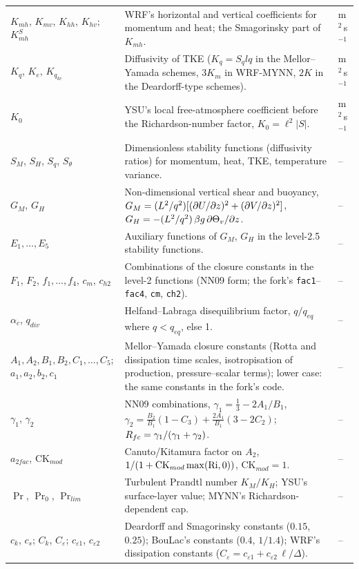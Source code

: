\begin{xltabular}{\linewidth}{@{}>{\raggedright\arraybackslash}p{3.6cm} >{\raggedright\arraybackslash}X >{\raggedright\arraybackslash}p{2.3cm}@{}}
$K_{mh}$, $K_{mv}$, $K_{hh}$, $K_{hv}$; $K^S_{mh}$ & WRF's horizontal and vertical coefficients for momentum and heat; the Smagorinsky part of $K_{mh}$. & m$^2$\,s$^{-1}$ \\
$K_q$, $K_e$, $K_{q_{ke}}$ & Diffusivity of TKE ($K_q = S_q l q$ in the Mellor--Yamada schemes, $3K_m$ in WRF-MYNN, $2K$ in the Deardorff-type schemes). & m$^2$\,s$^{-1}$ \\
$K_0$ & YSU's local free-atmosphere coefficient before the Richardson-number factor, $K_0 = \ell^2|S|$. & m$^2$\,s$^{-1}$ \\
$S_M$, $S_H$, $S_q$, $S_\theta$ & Dimensionless stability functions (diffusivity ratios) for momentum, heat, TKE, temperature variance. & -- \\
$G_M$, $G_H$ & Non-dimensional vertical shear and buoyancy, $G_M = (L^2/q^2)[(\partial U/\partial z)^2 + (\partial V/\partial z)^2]$, $G_H = -(L^2/q^2)\,\beta g\,\partial \Theta_v/\partial z$. & -- \\
$E_1, \ldots, E_5$ & Auxiliary functions of $G_M$, $G_H$ in the level-2.5 stability functions. & -- \\
$F_1$, $F_2$, $f_1, \ldots, f_4$, $c_m$, $c_{h2}$ & Combinations of the closure constants in the level-2 functions (NN09 form; the fork's \texttt{fac1}--\texttt{fac4}, \texttt{cm}, \texttt{ch2}). & -- \\
$\alpha_c$, $q_{div}$ & Helfand--Labraga disequilibrium factor, $q/q_{eq}$ where $q < q_{eq}$, else 1. & -- \\
$A_1, A_2, B_1, B_2, C_1, \ldots, C_5$; $a_1, a_2, b_2, c_1$ & Mellor--Yamada closure constants (Rotta and dissipation time scales, isotropisation of production, pressure--scalar terms); lower case: the same constants in the fork's code. & -- \\
$\gamma_1$, $\gamma_2$ & NN09 combinations, $\gamma_1 = \tfrac13 - 2A_1/B_1$, $\gamma_2 = \tfrac{B_2}{B_1}(1 - C_3) + \tfrac{2A_1}{B_1}(3 - 2C_2)$; $R_{fc} = \gamma_1/(\gamma_1 + \gamma_2)$. & -- \\
$a_{2fac}$, CK$_{mod}$ & Canuto/Kitamura factor on $A_2$, $1/(1 + \mathrm{CK}_{mod}\max(\mathrm{Ri}, 0))$, $\mathrm{CK}_{mod} = 1$. & -- \\
$\Pr$, $\Pr_0$, $\Pr_{lim}$ & Turbulent Prandtl number $K_M/K_H$; YSU's surface-layer value; MYNN's Richardson-dependent cap. & -- \\
$c_k$, $c_s$; $C_k$, $C_\varepsilon$; $c_{\varepsilon1}$, $c_{\varepsilon2}$ & Deardorff and Smagorinsky constants ($0.15$, $0.25$); BouLac's constants ($0.4$, $1/1.4$); WRF's dissipation constants ($C_\varepsilon = c_{\varepsilon1} + c_{\varepsilon2}\,\ell/\Delta$). & -- \\

\end{xltabular}
